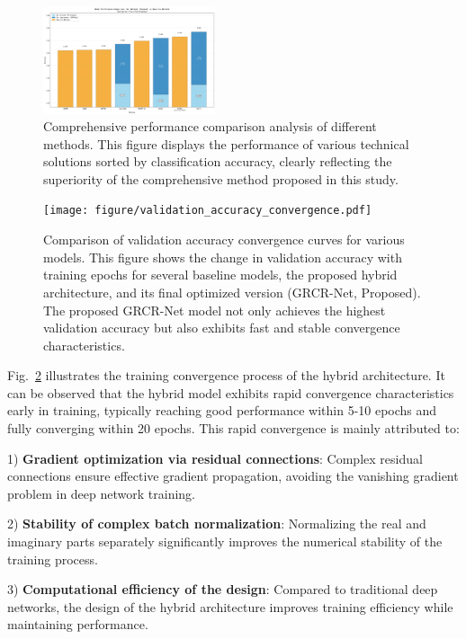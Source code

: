 \documentclass[conference]{IEEEtran}
\begin{document}
\begin{figure}[htbp]
\centering
\includegraphics[width=0.45\textwidth]{figure/sorted_stacked_comparison.png}
\caption{Comprehensive performance comparison analysis of different methods. This figure displays the performance of various technical solutions sorted by classification accuracy, clearly reflecting the superiority of the comprehensive method proposed in this study.}
\label{fig:method_comparison}
\end{figure}

\begin{figure}[htbp]
\centering
\texttt{[image: figure/validation\_accuracy\_convergence.pdf]}
\caption{Comparison of validation accuracy convergence curves for various models. This figure shows the change in validation accuracy with training epochs for several baseline models, the proposed hybrid architecture, and its final optimized version (GRCR-Net, Proposed). The proposed GRCR-Net model not only achieves the highest validation accuracy but also exhibits fast and stable convergence characteristics.}
\label{fig:training_convergence}
\end{figure}

Fig.~\ref{fig:training_convergence} illustrates the training convergence process of the hybrid architecture. It can be observed that the hybrid model exhibits rapid convergence characteristics early in training, typically reaching good performance within 5-10 epochs and fully converging within 20 epochs. This rapid convergence is mainly attributed to:

1) \textbf{Gradient optimization via residual connections}: Complex residual connections ensure effective gradient propagation, avoiding the vanishing gradient problem in deep network training.

2) \textbf{Stability of complex batch normalization}: Normalizing the real and imaginary parts separately significantly improves the numerical stability of the training process.

3) \textbf{Computational efficiency of the design}: Compared to traditional deep networks, the design of the hybrid architecture improves training efficiency while maintaining performance.
\end{document}
